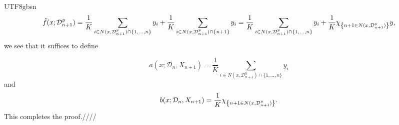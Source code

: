\documentclass[../../main.tex]{subfiles}
\begin{document}
\begin{CJK*}{UTF8}{gbsn}
\begin{equation*}
    \hat{f}(x; \mathcal{D}_{n+1}^y)
    = \frac{1}{K}\sum_{i \in N(x, \mathcal{D}_{n+1}^y)\cap \{1, \ldots, n\}}y_i
    + \frac{1}{K}\sum_{i \in N(x, \mathcal{D}_{n+1}^y)\cap \{n+1\}}y_i
    = \frac{1}{K}\sum_{i \in N(x, \mathcal{D}_{n+1}^y)\cap \{1, \ldots, n\}}y_i
    + \frac{1}{K}\chi_{\left \{ n+1 \in N(x, \mathcal{D}_{n+1}^y) \right \}}y,
\end{equation*}
we see that it suffices to define 

\begin{equation*}
    a(x; \mathcal{D}_{n}, X_{n+1}) = \frac{1}{K}\sum_{i \in N(x, \mathcal{D}_{n+1}^y)\cap \{1, \ldots, n\}}y_i
\end{equation*}
and 
\begin{equation*}
    b(x; \mathcal{D}_{n}, X_{n+1}) = \frac{1}{K}\chi_{\left \{ n+1 \in N(x, \mathcal{D}_{n+1}^y) \right \}}.
\end{equation*}
This completes the proof.////

\end{CJK*}
\end{document}
